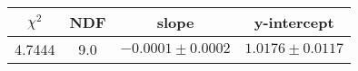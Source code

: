 \begin{tabular}{|c|c|c|c|}

\hline
$\chi^{2}$ & NDF & slope & y-intercept  \\
\hline
4.7444 & 9.0 & $-0.0001\pm0.0002$ & $1.0176\pm0.0117$ \\
\hline

\end{tabular}